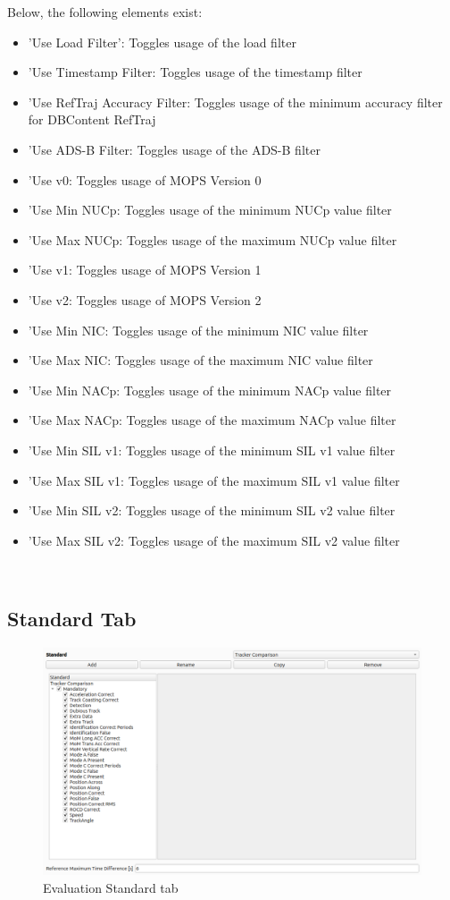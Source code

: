 Below, the following elements exist:
\begin{itemize}  
\item 'Use Load Filter': Toggles usage of the load filter
\item 'Use Timestamp Filter: Toggles usage of the timestamp filter
\item 'Use RefTraj Accuracy Filter: Toggles usage of the minimum accuracy filter for DBContent RefTraj
\item 'Use ADS-B Filter: Toggles usage of the ADS-B filter
\item 'Use v0: Toggles usage of MOPS Version 0
\item 'Use Min NUCp: Toggles usage of the minimum NUCp value filter
\item 'Use Max NUCp: Toggles usage of the maximum NUCp value filter
\item 'Use v1: Toggles usage of MOPS Version 1
\item 'Use v2: Toggles usage of MOPS Version 2
\item 'Use Min NIC: Toggles usage of the minimum NIC value filter
\item 'Use Max NIC: Toggles usage of the maximum NIC value filter
\item 'Use Min NACp: Toggles usage of the minimum NACp value filter
\item 'Use Max NACp: Toggles usage of the maximum NACp value filter
\item 'Use Min SIL v1: Toggles usage of the minimum SIL v1 value filter
\item 'Use Max SIL v1: Toggles usage of the maximum SIL v1 value filter
\item 'Use Min SIL v2: Toggles usage of the minimum SIL v2 value filter
\item 'Use Max SIL v2: Toggles usage of the maximum SIL v2 value filter
\end{itemize}
\ \\

\subsection{Standard Tab}

\begin{figure}[H]
  \hspace*{-2cm}
    \includegraphics[width=18cm,frame]{figures/eval_standard.png}
  \caption{Evaluation Standard tab}
\end{figure}

